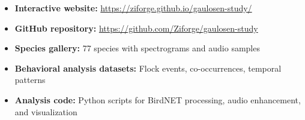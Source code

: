 \documentclass[twocolumn]{article}
\begin{document}
\begin{itemize}
\item \textbf{Interactive website:} \url{https://ziforge.github.io/gaulosen-study/}
\item \textbf{GitHub repository:} \url{https://github.com/Ziforge/gaulosen-study}
\item \textbf{Species gallery:} 77 species with spectrograms and audio samples
\item \textbf{Behavioral analysis datasets:} Flock events, co-occurrences, temporal patterns
\item \textbf{Analysis code:} Python scripts for BirdNET processing, audio enhancement, and visualization
\end{itemize}
\end{document}
